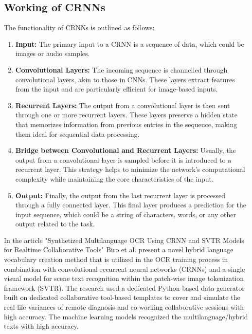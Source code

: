\subsection{Working of CRNNs}
The functionality of CRNNs is outlined as follows:

\begin{enumerate}
    \item \textbf{Input:} The primary input to a CRNN is a sequence of data, which could be images or audio samples.
    \item \textbf{Convolutional Layers:} The incoming sequence is channelled through convolutional layers, akin to those in CNNs. These layers extract features from the input and are particularly efficient for image-based inputs.
    \item \textbf{Recurrent Layers:} The output from a convolutional layer is then sent through one or more recurrent layers. These layers preserve a hidden state that memorizes information from previous entries in the sequence, making them ideal for sequential data processing.
    \item \textbf{Bridge between Convolutional and Recurrent Layers:} Usually, the output from a convolutional layer is sampled before it is introduced to a recurrent layer. This strategy helps to minimize the network's computational complexity while maintaining the core characteristics of the input.
    \item \textbf{Output:} Finally, the output from the last recurrent layer is processed through a fully connected layer. This final layer produces a prediction for the input sequence, which could be a string of characters, words, or any other output related to the task.
\end{enumerate}

In the article "Synthetized Multilanguage OCR Using CRNN and SVTR Models for Realtime Collaborative Tools" Biro et al. present a novel hybrid language vocabulary creation method that is utilized in the OCR training process in combination with convolutional recurrent neural networks (CRNNs) and a single visual model for scene text recognition within the patch-wise image tokenization framework (SVTR). The research used a dedicated Python-based data generator built on dedicated collaborative tool-based templates to cover and simulate the real-life variances of remote diagnosis and co-working collaborative sessions with high accuracy. The machine learning models recognized the multilanguage/hybrid texts with high accuracy.

